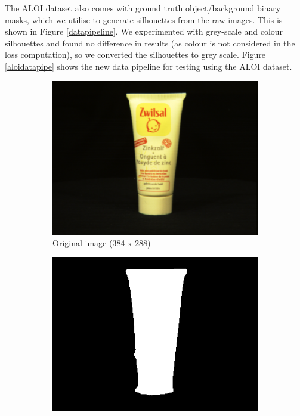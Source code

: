 \documentclass{article}
\begin{document}
The ALOI dataset also comes with ground truth object/background binary masks, which we utilise to generate silhouettes from the raw images. This is shown in Figure \ref{datapipeline}. We experimented with grey-scale and colour silhouettes and found no difference in results (as colour is not considered in the loss computation), so we converted the silhouettes to grey scale. Figure \ref{aloidatapipe} shows the new data pipeline for testing using the ALOI dataset.

\begin{figure}[h!]
  \centering
  \begin{subfigure}{0.23\textwidth}
    \centering
    \includegraphics[width=\textwidth]{images/moisturiserpng.png}
    \caption{Original image (384 x 288)}
    \label{moistpng}
  \end{subfigure}
  \hfill
  \begin{subfigure}{0.23\textwidth}
    \centering
    \includegraphics[width=\textwidth]{images/moisturisermask.png}

\end{subfigure}
\end{figure}
\end{document}
